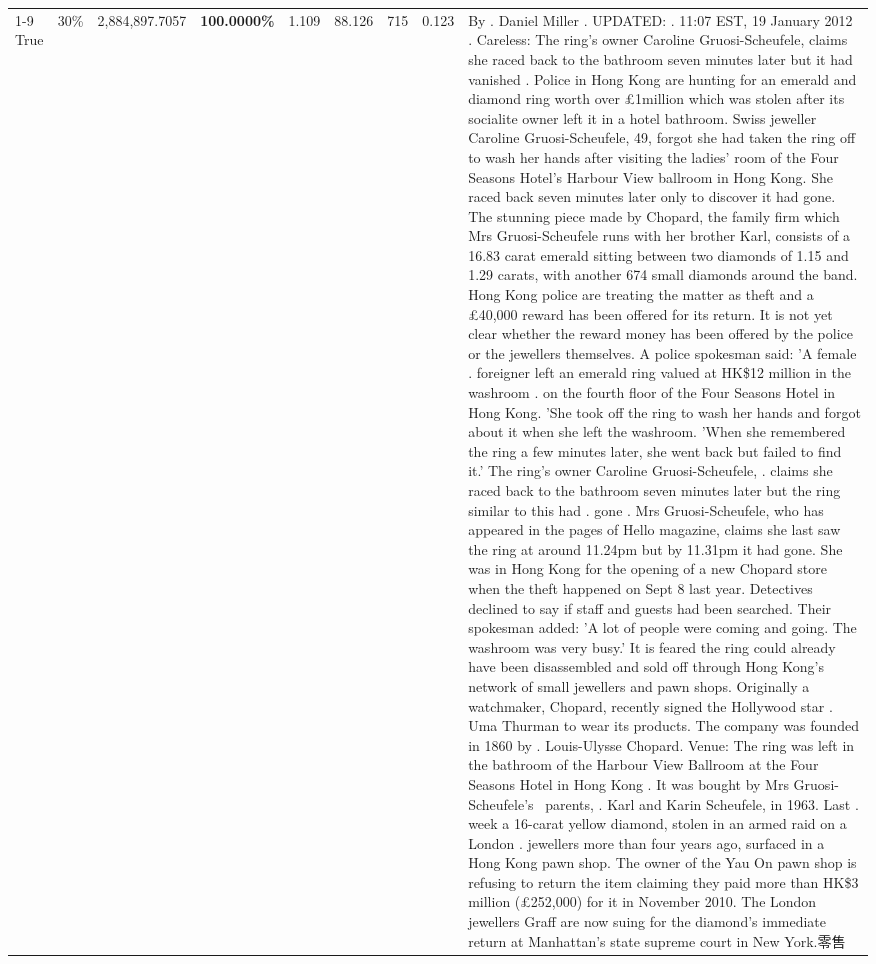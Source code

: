 \begin{table}[H]
\begin{tabular}{lllrlllll}
\cline{1-9} \cline{2-9}
True & 30\% & 2,884,897.7057 & \bfseries \color{red} 100.0000\% & 1.109 & 88.126 & 715 & 0.123 & By . Daniel Miller . UPDATED: . 11:07 EST, 19 January 2012 . Careless: The ring's owner Caroline Gruosi-Scheufele, claims she raced back to the bathroom seven minutes later but it had vanished . Police in Hong Kong are hunting for an emerald and diamond ring worth over £1million which was stolen after its socialite owner left it in a hotel bathroom. Swiss jeweller Caroline Gruosi-Scheufele, 49, forgot she had taken the ring off to wash her hands after visiting the ladies' room of the Four Seasons Hotel's Harbour View ballroom in Hong Kong. She raced back seven minutes later only to discover it had gone. The stunning piece made by Chopard, the family firm which Mrs Gruosi-Scheufele runs with her brother Karl, consists of a 16.83 carat emerald sitting between two diamonds of 1.15 and 1.29 carats, with another 674 small diamonds around the band. Hong Kong police are treating the matter as theft and a £40,000 reward has been offered for its return. It is not yet clear whether the reward money has been offered by the police or the jewellers themselves. A police spokesman said: 'A female . foreigner left an emerald ring valued at HK\$12 million in the washroom . on the fourth floor of the Four Seasons Hotel in Hong Kong. 'She took off the ring to wash her hands and forgot about it when she left the washroom. 'When she remembered the ring a few minutes later, she went back but failed to find it.' The ring's owner Caroline Gruosi-Scheufele, . claims she raced back to the bathroom seven minutes later but the ring similar to this had . gone . Mrs Gruosi-Scheufele, who has appeared in the pages of Hello magazine, claims she last saw the ring at around 11.24pm but by 11.31pm it had gone. She was in Hong Kong for the opening of a new Chopard store when the theft happened on Sept 8 last year. Detectives declined to say if staff and guests had been searched. Their spokesman added: 'A lot of people were coming and going. The washroom was very busy.' It is feared the ring could already have been disassembled and sold off through Hong Kong's network of small jewellers and pawn shops. Originally a watchmaker, Chopard, recently signed the Hollywood star . Uma Thurman to wear its products. The company was founded in 1860 by . Louis-Ulysse Chopard. Venue: The ring was left in the bathroom of the Harbour View Ballroom at the Four Seasons Hotel in Hong Kong . It was bought by Mrs Gruosi-Scheufele's  parents, . Karl and Karin Scheufele, in 1963. Last . week a 16-carat yellow diamond, stolen in an armed raid on a London . jewellers more than four years ago, surfaced in a Hong Kong pawn shop. The owner of the Yau On pawn shop is refusing to return the item claiming they paid more than HK\$3 million (£252,000) for it in November 2010. The London jewellers Graff are now suing for the diamond’s immediate return at Manhattan’s state supreme court in New York.零售 \\

\end{tabular}
\end{table}
